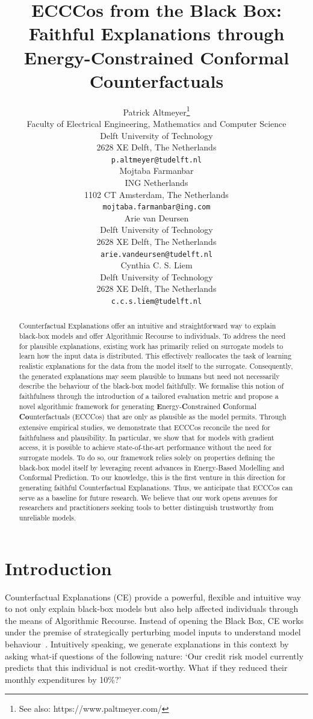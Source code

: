 \documentclass{article}
\title{ECCCos from the Black Box:\\
Faithful Explanations through\\
Energy-Constrained Conformal Counterfactuals}
\author{%
  Patrick Altmeyer\thanks{See also: https://www.paltmeyer.com/} \\
  Faculty of Electrical Engineering, Mathematics and Computer Science\\
  Delft University of Technology\\
  2628 XE Delft, The Netherlands \\
  \texttt{p.altmeyer@tudelft.nl} \\
  \And
  Mojtaba Farmanbar \\
  ING Netherlands \\
  1102 CT Amsterdam, The Netherlands \\
  \texttt{mojtaba.farmanbar@ing.com} \\
  \AND
  Arie van Deursen \\
  Delft University of Technology\\
  2628 XE Delft, The Netherlands \\
  \texttt{arie.vandeursen@tudelft.nl} \\
  \And
  Cynthia C. S. Liem \\
  Delft University of Technology\\
  2628 XE Delft, The Netherlands \\
  \texttt{c.c.s.liem@tudelft.nl} \\
}
\begin{document}
\maketitle


\begin{abstract}
  Counterfactual Explanations offer an intuitive and straightforward way to explain black-box models and offer Algorithmic Recourse to individuals. To address the need for plausible explanations, existing work has primarily relied on surrogate models to learn how the input data is distributed. This effectively reallocates the task of learning realistic explanations for the data from the model itself to the surrogate. Consequently, the generated explanations may seem plausible to humans but need not necessarily describe the behaviour of the black-box model faithfully. We formalise this notion of faithfulness through the introduction of a tailored evaluation metric and propose a novel algorithmic framework for generating \textbf{E}nergy-\textbf{C}onstrained \textbf{C}onformal \textbf{Co}unterfactuals (ECCCos) that are only as plausible as the model permits. Through extensive empirical studies, we demonstrate that ECCCos reconcile the need for faithfulness and plausibility. In particular, we show that for models with gradient access, it is possible to achieve state-of-the-art performance without the need for surrogate models. To do so, our framework relies solely on properties defining the black-box model itself by leveraging recent advances in Energy-Based Modelling and Conformal Prediction. To our knowledge, this is the first venture in this direction for generating faithful Counterfactual Explanations. Thus, we anticipate that ECCCos can serve as a baseline for future research. We believe that our work opens avenues for researchers and practitioners seeking tools to better distinguish trustworthy from unreliable models.
\end{abstract}

\section{Introduction}\label{intro}

Counterfactual Explanations (CE) provide a powerful, flexible and intuitive way to not only explain black-box models but also help affected individuals through the means of Algorithmic Recourse. Instead of opening the Black Box, CE works under the premise of strategically perturbing model inputs to understand model behaviour~\citep{wachter2017counterfactual}. Intuitively speaking, we generate explanations in this context by asking what-if questions of the following nature: `Our credit risk model currently predicts that this individual is not credit-worthy. What if they reduced their monthly expenditures by 10\%?'
\end{document}
